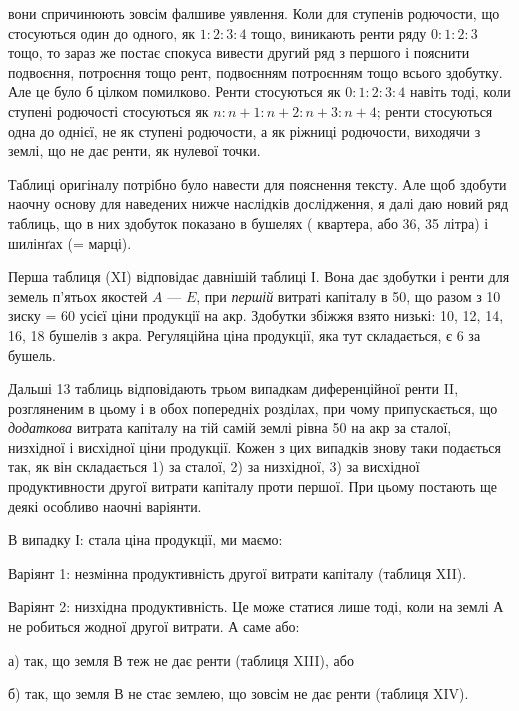 \parcont{}  %
вони спричинюють зовсім фалшиве уявлення. Коли для ступенів родючости, що
стосуються один до одного, як $1: 2 : 3 : 4$ тощо, виникають ренти ряду $0 : 1 : 2 : 3$
тощо, то зараз же постає спокуса вивести другий ряд з першого і пояснити
подвоєння, потроєння тощо рент, подвоєнням потроєнням тощо всього здобутку.
Але це було б цілком помилково. Ренти стосуються як $0 : 1 : 2 : 3 : 4$ навіть
тоді, коли ступені родючості стосуються як $n : n + 1 : n + 2 : n + 3 : n + 4$;
ренти стосуються одна до однієї, не як ступені родючости, а як ріжниці родючости,
виходячи з землі, що не дає ренти, як нулевої точки.

Таблиці оригіналу потрібно було навести для пояснення тексту. Але щоб
здобути наочну основу для наведених нижче наслідків дослідження, я далі
даю новий ряд таблиць, що в них здобуток показано в бушелях (  квартера,
або 36, 35 літра) і шилінґах (= марці).

Перша таблиця (XI) відповідає давнішій таблиці І. Вона дає здобутки
і ренти для земель п’ятьох якостей $A$ — $E$, при \emph{першій} витраті капіталу в 50, що разом з 10 зиску = 60 усієї ціни продукції на акр. Здобутки
збіжжя взято низькі: 10, 12, 14, 16, 18 бушелів з акра. Регуляційна
ціна продукції, яка тут складається, є 6 за бушель.

Дальші 13 таблиць відповідають трьом випадкам диференційної ренти II,
розгляненим в цьому і в обох попередніх розділах, при чому припускається, що
\emph{додаткова} витрата капіталу на тій самій землі рівна 50 на акр за сталої,
низхідної і висхідної ціни продукції. Кожен з цих випадків знову таки
подається так, як він складається 1) за сталої, 2) за низхідної, 3) за висхідної
продуктивности другої витрати капіталу проти першої. При цьому постають ще
деякі особливо наочні варіянти.

В випадку І: стала ціна продукції, ми маємо:

Варіянт 1: незмінна продуктивність другої витрати капіталу (таблиця XII).

Варіянт 2: низхідна продуктивність. Це може статися лише тоді, коли на землі
А не робиться жодної другої витрати. А саме або:

а) так, що земля $В$ теж не дає ренти (таблиця XIII), або

б) так, що земля $В$ не стає землею, що зовсім не дає ренти (таблиця XIV).

